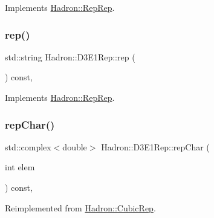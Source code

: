 Implements \mbox{\hyperlink{structHadron_1_1RepRep_ab3213025f6de249f7095892109575fde}{Hadron\+::\+Rep\+Rep}}.

\mbox{\label{structHadron_1_1D3E1Rep_a31b989d15d93cd4e876bfabd809b84ee}} 
\subsubsection{\texorpdfstring{rep()}{rep()}\hspace{0.1cm}{\footnotesize\ttfamily [3/3]}}
{\footnotesize\ttfamily std\+::string Hadron\+::\+D3\+E1\+Rep\+::rep (\begin{DoxyParamCaption}{ }\end{DoxyParamCaption}) const\hspace{0.3cm}{\ttfamily [inline]}, {\ttfamily [virtual]}}



Implements \mbox{\hyperlink{structHadron_1_1RepRep_ab3213025f6de249f7095892109575fde}{Hadron\+::\+Rep\+Rep}}.

\mbox{\label{structHadron_1_1D3E1Rep_a67caadd543a2e693c1be006d8e11742c}} 
\subsubsection{\texorpdfstring{repChar()}{repChar()}\hspace{0.1cm}{\footnotesize\ttfamily [1/2]}}
{\footnotesize\ttfamily std\+::complex$<$double$>$ Hadron\+::\+D3\+E1\+Rep\+::rep\+Char (\begin{DoxyParamCaption}\item[{int}]{elem }\end{DoxyParamCaption}) const\hspace{0.3cm}{\ttfamily [inline]}, {\ttfamily [virtual]}}



Reimplemented from \mbox{\hyperlink{structHadron_1_1CubicRep_af45227106e8e715e84b0af69cd3b36f8}{Hadron\+::\+Cubic\+Rep}}.

